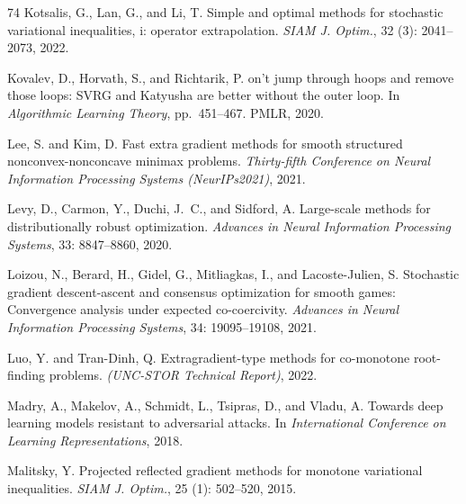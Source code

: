 \documentclass{article}
\theoremstyle{plain}
\theoremstyle{definition}
\theoremstyle{remark}
\begin{document}
\begin{thebibliography}{74}
Kotsalis, G., Lan, G., and Li, T.
\newblock Simple and optimal methods for stochastic variational inequalities,
  i: operator extrapolation.
\newblock \emph{SIAM J. Optim.}, 32 (3): 2041--2073, 2022.

Kovalev, D., Horvath, S., and Richtarik, P.
on't jump through hoops and remove those loops: {SVRG} and
  {K}atyusha are better without the outer loop.
\newblock In \emph{Algorithmic Learning Theory}, pp.\  451--467. PMLR, 2020.

Lee, S. and Kim, D.
\newblock Fast extra gradient methods for smooth structured
  nonconvex-nonconcave minimax problems.
\newblock \emph{Thirty-fifth Conference on Neural Information Processing
  Systems (NeurIPs2021)}, 2021.

Levy, D., Carmon, Y., Duchi, J.~C., and Sidford, A.
\newblock Large-scale methods for distributionally robust optimization.
\newblock \emph{Advances in Neural Information Processing Systems},
  33: 8847--8860, 2020.

Loizou, N., Berard, H., Gidel, G., Mitliagkas, I., and Lacoste-Julien, S.
\newblock Stochastic gradient descent-ascent and consensus optimization for
  smooth games: {C}onvergence analysis under expected co-coercivity.
\newblock \emph{Advances in Neural Information Processing Systems},
  34: 19095--19108, 2021.

Luo, Y. and Tran-Dinh, Q.
\newblock Extragradient-type methods for co-monotone root-finding problems.
\newblock \emph{(UNC-STOR Technical Report)}, 2022.

Madry, A., Makelov, A., Schmidt, L., Tsipras, D., and Vladu, A.
\newblock Towards deep learning models resistant to adversarial attacks.
\newblock In \emph{International Conference on Learning Representations}, 2018.

Malitsky, Y.
\newblock Projected reflected gradient methods for monotone variational
  inequalities.
\newblock \emph{SIAM J. Optim.}, 25 (1): 502--520, 2015.


\end{thebibliography}
\end{document}
